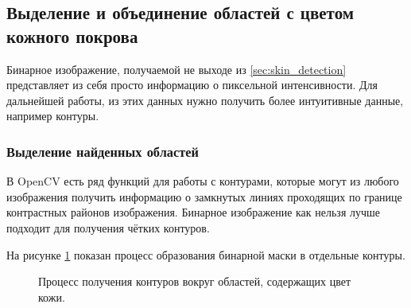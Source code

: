 \documentclass[12pt]{report}
\begin{document}
\subsection{Выделение и объединение областей с цветом кожного покрова}

Бинарное изображение, получаемой не выходе из \ref{sec:skin_detection} представляет из себя просто информацию о 
пиксельной интенсивности. Для дальнейшей работы, из этих данных нужно получить более интуитивные данные, например 
контуры. 
\subsubsection{Выделение найденных областей}
В OpenCV есть ряд функций для работы с контурами, которые могут из любого изображения получить информацию о 
замкнутых 
линиях проходящих по границе контрастных районов изображения. Бинарное изображение как нельзя лучше подходит для 
получения чётких контуров.

На рисунке \ref{fig:countour_process} показан процесс образования бинарной маски в отдельные контуры.

\begin{figure}[h]
	\centering
	\caption{Процесс получения контуров вокруг областей, содержащих цвет кожи.}
	\label{fig:countour_process}
\end{figure}
\end{document}
